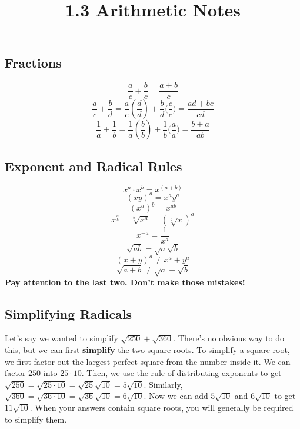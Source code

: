 \documentclass{article}
\title{1.3 Arithmetic Notes}
\author{}
\date{}
\begin{document}
\maketitle
\subsection*{Fractions}
    \[\frac{a}{c} + \frac{b}{c} = \frac{a + b}{c}\]
    \[\frac{a}{c} + \frac{b}{d} = \frac{a}{c} \left(\frac{d}{d}\right) + \frac{b}{d}\biggl(\frac{c}{c}\biggl) = \frac{ad + bc}{cd}\]
    \[\frac{1}{a} + \frac{1}{b} = \frac{1}{a} \left(\frac{b}{b}\right) + \frac{1}{b}\biggl(\frac{a}{a}\biggl) = \frac{b + a}{ab}\] 

\subsection*{Exponent and Radical Rules}
    \[x^a \cdot x^b = x^{(a + b)}\]
    \[(xy)^a = x^a y^a\]
    \[(x^a)^b = x^{ab}\]
    \[x^{\frac{a}{b}} = \sqrt[b]{x^a} = \left(\sqrt[b]{x}\right)^a\]
    \[x^{-a} = \frac{1}{x^a}\]
    \[\sqrt{ab} = \sqrt{a}\sqrt{b}\]
    \[(x + y)^a \neq x^a + y^a\]
    \[\sqrt{a + b} \neq \sqrt{a} + \sqrt{b}\]
    \textbf{Pay attention to the last two. Don't make those mistakes!}

\subsection*{Simplifying Radicals}
    Let's say we wanted to simplify $\sqrt{250} + \sqrt{360}$.
    There's no obvious way to do this, but we can first \textbf{simplify} the two square roots.
    To simplify a square root, we first factor out the largest perfect square from the number inside it.
    We can factor $250$ into $25 \cdot 10$.
    Then, we use the rule of distributing exponents to get $\sqrt{250} = \sqrt{25 \cdot 10} = \sqrt{25}\sqrt{10} = 5\sqrt{10}$.
    Similarly, $\sqrt{360} = \sqrt{36 \cdot 10} = \sqrt{36}\sqrt{10} = 6\sqrt{10}$.
    Now we can add $5\sqrt{10}$ and $6\sqrt{10}$ to get $11\sqrt{10}$.
    When your answers contain square roots, you will generally be required to simplify them.
\end{document}

